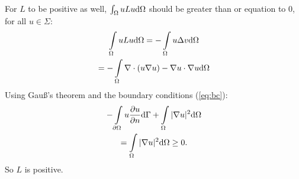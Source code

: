 For $L$ to be positive as well, $\int\displaylimits_\Omega uLu \mathrm{d}\Omega$ should be greater than or equation to 0, for all $u\in \Sigma$:
\begin{gather*}
    \int\displaylimits_\Omega uLu \mathrm{d}\Omega = - \int\displaylimits_\Omega u\Delta v \mathrm{d}\Omega\\
    = -\int\displaylimits_\Omega \nabla \cdot(u\nabla u) - \nabla u\cdot\nabla u \mathrm{d}\Omega
\end{gather*} Using Gau\ss's theorem and the boundary conditions (\ref{eq:bc}):
\begin{gather*}
    -\int\displaylimits_{\partial\Omega} u\frac{\partial u}{\partial n} \mathrm{d}\Gamma + \int\displaylimits_{\Omega} |\nabla u|^2 \mathrm{d}\Omega \\
    =\int\displaylimits_\Omega |\nabla u|^2 \mathrm{d}\Omega \geq 0.
\end{gather*} So $L$ is positive.


